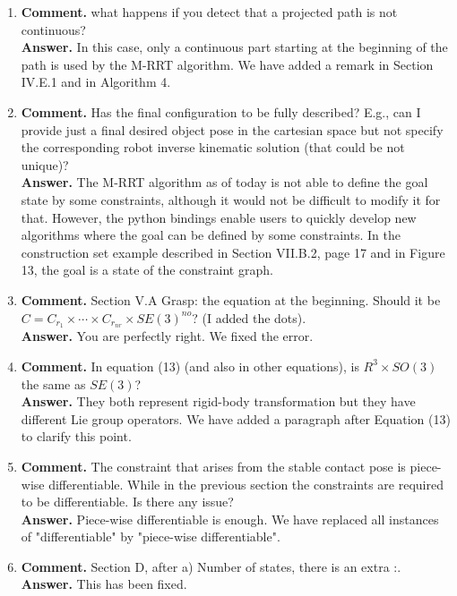 \documentclass{article}
\begin{document}
\begin{enumerate}
\item \textbf{Comment.} what happens if you detect that a projected
  path is not continuous?\\
  \textbf{Answer.} In this case, only a
  continuous part starting at the beginning of the path is used by the
  M-RRT algorithm. We have added a remark in Section IV.E.1 and in
  Algorithm 4.

\item \textbf{Comment.} Has the final configuration to be fully
  described? E.g., can I provide just a final desired object pose in
  the cartesian space but not specify the corresponding robot inverse
  kinematic solution (that could be not unique)?\\
  \textbf{Answer.}  The M-RRT algorithm as of today is not able to
  define the goal state by some constraints, although it would not be
  difficult to modify it for that. However, the python bindings enable
  users to quickly develop new algorithms where the goal can be
  defined by some constraints. In the construction set example
  described in Section VII.B.2, page 17 and in Figure 13, the goal is
  a state of the constraint graph.

\item \textbf{Comment.} Section V.A Grasp: the equation at the
  beginning. Should it be $C = C_{r_1} \times \cdots \times C_{r_{nr}} \times
  SE(3)^{no}$? (I added the dots).\\
  \textbf{Answer.} You are perfectly right. We fixed the error.

\item \textbf{Comment.} In equation (13) (and also in other
  equations), is $R^3 \times SO(3)$ the same as $SE(3)$?\\
  \textbf{Answer.} They both represent rigid-body transformation but
  they have different Lie group operators. We have added a paragraph
  after Equation (13) to clarify this point.

\item \textbf{Comment.} The constraint that arises from the stable
  contact pose is piece-wise differentiable. While in the previous
  section the constraints are required to be differentiable. Is there
  any issue?\\
  \textbf{Answer.} Piece-wise differentiable is enough. We have replaced all
  instances of "differentiable" by "piece-wise differentiable".

\item \textbf{Comment.} Section D, after a) Number of states, there is an extra :.\\
  \textbf{Answer.} This has been fixed.


\end{enumerate}
\end{document}
